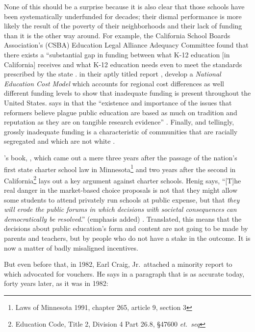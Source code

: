 None of this should be a surprise because it is also clear that those schools have been systematically underfunded for decades; their dismal performance is more likely the result of the poverty of their neighborhoods and their lack of funding than it is the other way around. For example, the California School Boards Association's (CSBA) Education Legal Alliance Adequacy Committee found that there exists a ``substantial gap in funding between what K-12 education [in California] receives and what K-12 education needs even to meet the standards prescribed by the state \parencite[\textit{iii}]{Bray2015}. \textcite{Baker.etal2018} in their aptly titled report , develop a \textit{National Education Cost Model} \parencite%
{Baker.etal2018} which accounts for regional cost differences as well different funding levels to show that inadequate funding is present throughout the United States. \textcite{Garcia2018} says in  that the ``existence and importance of the issues that reformers believe plague public education are based as much on tradition and reputation as they are on tangible research evidence'' \parencite[54]{Garcia2018}. Finally, and tellingly, grossly inadequate funding is a characteristic of communities that are racially segregated and which are not white \parencite{Darling-Hammond2012, Rothstein2017}.

\textcite{Henig1994}'s book, , which came out a mere three years after the passage of the nation's first state charter school law in Minnesota\footnote{Laws of Minnesota 1991, chapter 265, article 9, section 3} and two years after the second in California\footnote{Education Code, Title 2, Division 4 Part 26.8, §47600 \textit{et.\ seq}} lays out a key argument against charter schools. Henig says, ``[T]he real danger in the market-based choice proposals is not that they might allow some students to attend privately run schools at public expense, but that \emph{they will erode the public forums in which decisions with societal consequences can democratically be resolved}.'' (emphasis added) \parencite[\emph{xiii}]{Henig1994}. Translated, this means that the decisions about public education's form and content are not going to be made by parents and teachers, but by people who do not have a stake in the outcome. It is now a matter of badly misaligned incentives.

But even before that, in 1982, Earl Craig, Jr.\ attached a minority report to  which advocated for vouchers. He says in a paragraph that is as accurate today, forty years later, as it was in 1982: 

